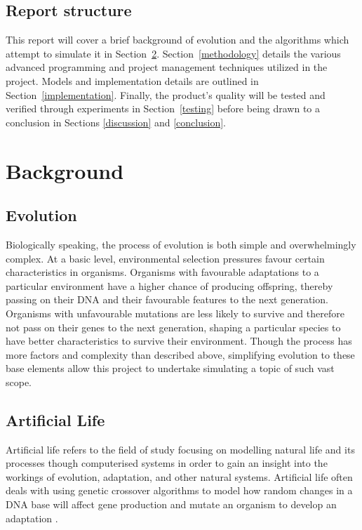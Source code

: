 \documentclass[a4paper, oneside, 11pt]{report}
\begin{document}
\section{Report structure}
This report will cover a brief background of evolution and the algorithms which attempt to simulate it in Section~\ref{background}. Section~\ref{methodology} details the various advanced programming and project management techniques utilized in the project. Models and implementation details are outlined in Section~\ref{implementation}. Finally, the product's quality will be tested and verified through experiments in Section~\ref{testing} before being drawn to a conclusion in Sections \ref{discussion} and \ref{conclusion}.

\chapter{Background}\label{background}

\section{Evolution}
Biologically speaking, the process of evolution is both simple and overwhelmingly complex. At a basic level, environmental selection pressures favour certain characteristics in organisms. Organisms with favourable adaptations to a particular environment have a higher chance of producing offspring, thereby passing on their DNA and their favourable features to the next generation. Organisms with unfavourable mutations are less likely to survive and therefore not pass on their genes to the next generation, shaping a particular species to have better characteristics to survive their environment. Though the process has more factors and complexity than described above, simplifying evolution to these base elements allow this project to undertake simulating a topic of such vast scope.

\section{Artificial Life}
Artificial life refers to the field of study focusing on modelling natural life and its processes though computerised systems in order to gain an insight into the workings of evolution, adaptation, and other natural systems. Artificial life often deals with using genetic crossover algorithms to model how random changes in a DNA base will affect gene production and mutate an organism to develop an adaptation \cite{grand}.
\end{document}
